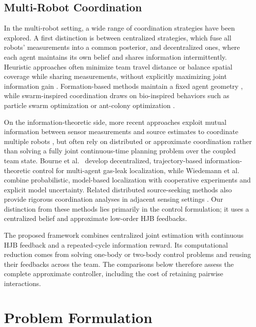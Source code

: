 \documentclass{article}
\begin{document}
\subsection{Multi-Robot Coordination}

In the multi-robot setting, a wide range of coordination strategies have been explored.
A first distinction is between centralized strategies, which fuse all robots' measurements into a common posterior, and decentralized ones, where each agent maintains its own belief and shares information intermittently.
Heuristic approaches often minimize team travel distance or balance spatial coverage while sharing measurements, without explicitly maximizing joint information gain \cite{rahbar2020multirobot}.
Formation-based methods maintain a fixed agent geometry \cite{ristic2017formation}, while swarm-inspired coordination draws on bio-inspired behaviors such as particle swarm optimization \cite{bourne2019bioinspired} or ant-colony optimization \cite{meng2006aco}.

On the information-theoretic side, more recent approaches exploit mutual information between sensor measurements and source estimates to coordinate multiple robots \cite{shaffer2025multirobot}, but often rely on distributed or approximate coordination rather than solving a fully joint continuous-time planning problem over the coupled team state.
Bourne et al.~\cite{bourne2020outdoor} develop decentralized, trajectory-based information-theoretic control for multi-agent gas-leak localization, while Wiedemann et al.~\cite{wiedemann2019coop} combine probabilistic, model-based localization with cooperative experiments and explicit model uncertainty.
Related distributed source-seeking methods also provide rigorous coordination analyses in adjacent sensing settings \cite{zhang2023distributed}.
Our distinction from these methods lies primarily in the control formulation; it uses a centralized belief and approximate low-order HJB feedbacks.

The proposed framework combines centralized joint estimation with continuous HJB feedback and a repeated-cycle information reward.
Its computational reduction comes from solving one-body or two-body control problems and reusing their feedbacks across the team.
The comparisons below therefore assess the complete approximate controller, including the cost of retaining pairwise interactions.

\section{Problem Formulation}
\label{sec:problem}
\end{document}
